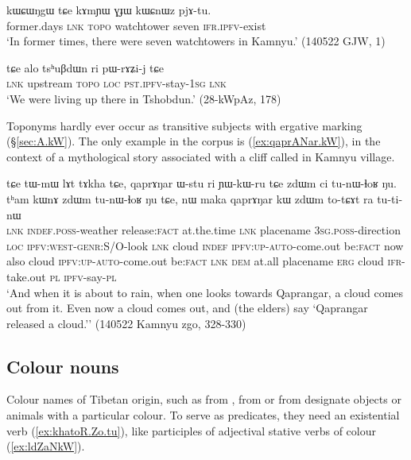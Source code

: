\begin{exe}
\ex \label{ex:kAmYW.GJW}
 \gll  kɯɕɯŋgɯ tɕe kɤmɲɯ ɣɟɯ kɯɕnɯz pjɤ-tu. \\
 former.days \textsc{lnk}  \textsc{topo} watchtower  seven \textsc{ifr}.\textsc{ipfv}-exist \\
 \glt `In former times, there were seven watchtowers in Kamnyu.' (140522 GJW, 1)
\end{exe}

\begin{exe}
\ex \label{ex:tshuBdWn.ri}
 \gll  tɕe alo tsʰuβdɯn ri pɯ-rɤʑi-j tɕe \\
 \textsc{lnk} upstream  \textsc{topo} \textsc{loc} \textsc{pst}.\textsc{ipfv}-stay-\textsc{1sg} \textsc{lnk} \\
 \glt `We were living up there in Tshobdun.' (28-kWpAz, 178)
\end{exe}

Toponyms hardly ever occur as transitive subjects with ergative marking (§\ref{sec:A.kW}). The only example in the corpus is (\ref{ex:qaprANar.kW}), in the context of a mythological story associated with a cliff called  in Kamnyu village.

\begin{exe}
\ex \label{ex:qaprANar.kW}
\gll tɕe tɯ-mɯ lɤt tɤkha tɕe, qaprɤŋar ɯ-stu ri ɲɯ-kɯ-ru tɕe zdɯm ci tu-nɯ-ɬoʁ ŋu. tʰam kɯnɤ zdɯm tu-nɯ-ɬoʁ ŋu tɕe, nɯ maka qaprɤŋar kɯ zdɯm to-tɕɤt ra tu-ti-nɯ \\
\textsc{lnk} \textsc{indef}.\textsc{poss}-weather release:\textsc{fact} at.the.time \textsc{lnk} placename \textsc{3sg}.\textsc{poss}-direction \textsc{loc} \textsc{ipfv}:\textsc{west}-\textsc{genr}:S/O-look \textsc{lnk} cloud \textsc{indef} \textsc{ipfv}:\textsc{up}-\textsc{auto}-come.out be:\textsc{fact} now also cloud \textsc{ipfv}:\textsc{up}-\textsc{auto}-come.out be:\textsc{fact} \textsc{lnk} \textsc{dem} at.all placename \textsc{erg} cloud \textsc{ifr}-take.out \textsc{pl} \textsc{ipfv}-say-\textsc{pl} \\
\glt `And when it is about to rain, when one looks towards Qaprangar, a cloud comes out from it. Even now a cloud comes out, and (the elders) say `Qaprangar released a cloud.''  (140522 Kamnyu zgo, 328-330)
\end{exe}

\subsection{Colour nouns} \label{sec:tibetan.colours}
Colour names of Tibetan origin, such as  from ,  from  or  from  designate objects or animals with a particular colour. To serve as predicates, they need an existential verb  (\ref{ex:khatoR.Zo.tu}), like participles of adjectival stative verbs of colour (\ref{ex:ldZaNkW}). 

